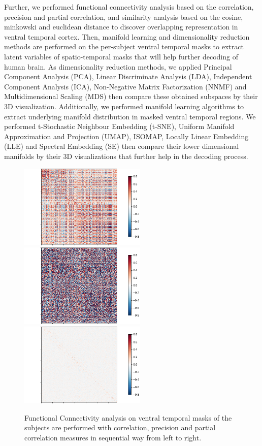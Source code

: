 \documentclass[10pt, twocolumn, letterpaper]{article}
\begin{document}
Further, we performed functional connectivity analysis based on the correlation, precision and partial correlation, and similarity analysis based on the cosine, minkowski and euclidean distance to discover overlapping representation in ventral temporal cortex. Then, manifold learning and dimensionality reduction methods are performed on the per-subject ventral temporal masks to extract latent variables of spatio-temporal masks that will help further decoding of human brain. As dimensionality reduction methods, we applied Principal Component Analysis (PCA), Linear Discriminate Analysis (LDA), Independent Component Analysis (ICA), Non-Negative Matrix Factorization (NNMF) and Multidimensional Scaling (MDS) then compare these obtained subspaces by their 3D visualization. Additionally, we performed manifold learning algorithms to extract underlying manifold distribution in masked ventral temporal regions. We performed t-Stochastic Neighbour Embedding (t-SNE), Uniform Manifold Approximation and Projection (UMAP), ISOMAP, Locally Linear Embedding (LLE) and Spectral Embedding (SE) then compare their lower dimensional manifolds by their 3D visualizations that further help in the decoding process.

\begin{figure}
    \includegraphics[width=.35\linewidth, height=4cm,  valign=c]{images/correlation.png}
    \includegraphics[width=.35\linewidth, height=4cm,  valign=c]{images/precision.png}
    \includegraphics[width=.35\linewidth, height=4cm,  valign=c, valign=c]{images/partial_correlation.png}
    \caption{Functional Connectivity analysis on ventral temporal masks of the subjects are performed with correlation, precision and partial correlation measures in sequential way from left to right.}\label{fig:functional}
\end{figure}
\end{document}
